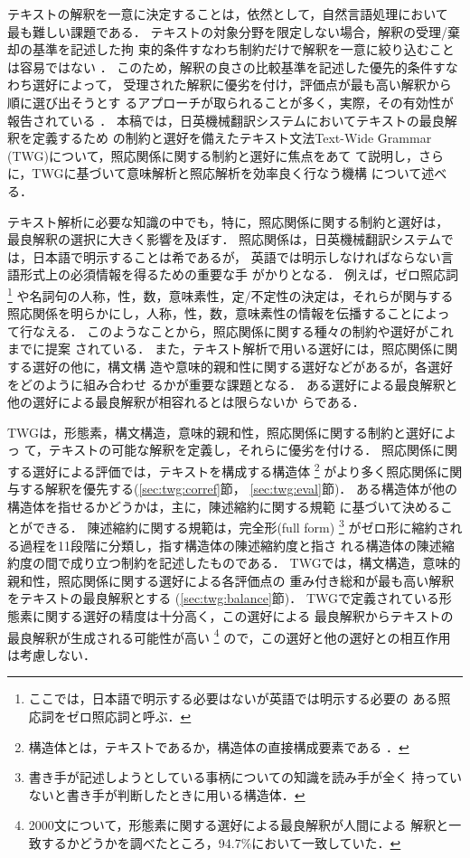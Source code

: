 テキストの解釈を一意に決定することは，依然として，自然言語処理において
最も難しい課題である．
テキストの対象分野を限定しない場合，解釈の受理/棄却の基準を記述した拘
束的条件すなわち制約だけで解釈を一意に絞り込むことは容易ではない
\cite{Tsujii86,Nagao92}．
このため，解釈の良さの比較基準を記述した優先的条件すなわち選好によって，
受理された解釈に優劣を付け，評価点が最も高い解釈から順に選び出そうとす
るアプローチが取られることが多く，実際，その有効性が報告されている
\cite{Fass83,Schubert84,Petitpierre87,Hobbs90}．
本稿では，日英機械翻訳システムにおいてテキストの最良解釈を定義するため
の制約と選好を備えたテキスト文法Text-Wide Grammar
(TWG)\cite{Jelinek93}について，照応関係に関する制約と選好に焦点をあて
て説明し，さらに，TWGに基づいて意味解析と照応解析を効率良く行なう機構
について述べる．

テキスト解析に必要な知識の中でも，特に，照応関係に関する制約と選好は，
最良解釈の選択に大きく影響を及ぼす． 
照応関係は，日英機械翻訳システムでは，日本語で明示することは希であるが，
英語では明示しなければならない言語形式上の必須情報を得るための重要な手
がかりとなる．
例えば，ゼロ照応詞
\footnote{ここでは，日本語で明示する必要はないが英語では明示する必要の
ある照応詞をゼロ照応詞と呼ぶ．}
や名詞句の人称，性，数，意味素性，定/不定性の決定は，それらが関与する
照応関係を明らかにし，人称，性，数，意味素性の情報を伝播することによっ
て行なえる．
このようなことから，照応関係に関する種々の制約や選好がこれまでに提案
されている\cite{Yoshimoto86,Fujisawa93,Murata93,Nakaiwa93}．
また，テキスト解析で用いる選好には，照応関係に関する選好の他に，構文構
造や意味的親和性に関する選好などがあるが，各選好をどのように組み合わせ
るかが重要な課題となる．
ある選好による最良解釈と他の選好による最良解釈が相容れるとは限らないか
らである．

TWGは，形態素，構文構造，意味的親和性，照応関係に関する制約と選好によっ
て，テキストの可能な解釈を定義し，それらに優劣を付ける．
照応関係に関する選好による評価では，テキストを構成する構造体
\footnote{構造体とは，テキストであるか，構造体の直接構成要素である
\cite{Jelinek65}．} 
がより多く照応関係に関与する解釈を優先する(\ref{sec:twg:corref}節，
\ref{sec:twg:eval}節)．
ある構造体が他の構造体を指せるかどうかは，主に，陳述縮約に関する規範
\cite{Jelinek65,Jelinek66}に基づいて決めることができる．
陳述縮約に関する規範は，完全形(full form)
\footnote{書き手が記述しようとしている事柄についての知識を読み手が全く
持っていないと書き手が判断したときに用いる構造体．}
がゼロ形に縮約される過程を11段階に分類し，指す構造体の陳述縮約度と指さ
れる構造体の陳述縮約度の間で成り立つ制約を記述したものである．
TWGでは，構文構造，意味的親和性，照応関係に関する選好による各評価点の
重み付き総和が最も高い解釈をテキストの最良解釈とする
(\ref{sec:twg:balance}節)．
TWGで定義されている形態素に関する選好の精度は十分高く，この選好による
最良解釈からテキストの最良解釈が生成される可能性が高い
\footnote{2000文について，形態素に関する選好による最良解釈が人間による
解釈と一致するかどうかを調べたところ，94.7\%において一致していた．}
ので，この選好と他の選好との相互作用は考慮しない．

